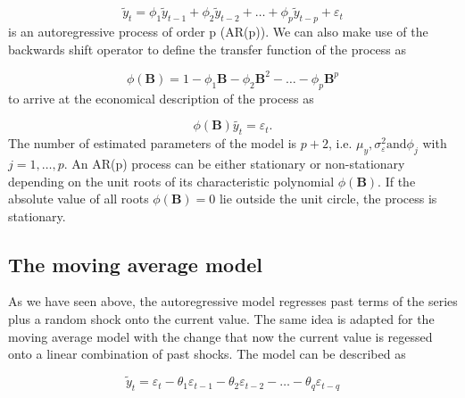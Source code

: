 \begin{equation}
        \tilde{y}_{t}=\phi_{1} \tilde{y}_{t-1}+\phi_{2} \tilde{y}_{t-2}+\dots+\phi_{p} \tilde{y}_{t-p}+\varepsilon_{t}
\end{equation}
%
is an autoregressive process of order p (AR(p)). We can also make use of the backwards shift operator to define the transfer function of the process as 

\begin{equation}
        \phi(\boldsymbol{B})=1-\phi_{1} \boldsymbol{B}-\phi_{2} \boldsymbol{B}^{2}-\dots-\phi_{p} \boldsymbol{B}^{p}
\end{equation}
%
to arrive at the economical description of the process as

\begin{equation}
        \phi(\boldsymbol{B})\tilde{y_t} = \varepsilon_t.
\end{equation}
%
The number of estimated parameters of the model is $p + 2$, i.e. $\mu_y, \sigma^2_\varepsilon \mathrm{and} \phi_j$ with $j = 1,\dots, p$. An AR(p) process can be either stationary or non-stationary depending on the unit roots of its characteristic polynomial $\phi(\boldsymbol{B})$. If the absolute value of all roots $\phi(\boldsymbol{B}) = 0$ lie outside the unit circle, the process is stationary. 

\subsection{The moving average model}

As we have seen above, the autoregressive model regresses past terms of the series plus a random shock onto the current value. The same idea is adapted for the moving average model with the change that now the current value is regessed onto a linear combination of past shocks. The model can be described as 

\begin{equation}
        \tilde{y}_{t}=\varepsilon_{t}-\theta_{1} \varepsilon_{t-1}-\theta_{2} \varepsilon_{t-2}-\dots-\theta_{q} \varepsilon_{t-q}
\end{equation}

















